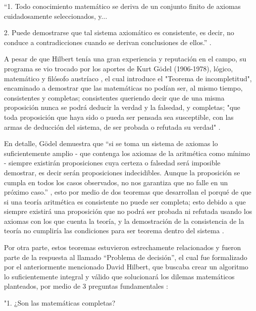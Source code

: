 \documentclass[12pt]{article}
\begin{document}
{“1. Todo conocimiento matemático se deriva de un conjunto finito de axiomas cuidadosamente seleccionados, y...

2. Puede demostrarse que tal sistema axiomático es consistente, es decir, no conduce a contradicciones cuando se derivan conclusiones de ellos.” \citep{IncytdeMorales}.
\newline

A pesar de que Hilbert tenía una gran experiencia y reputación en el campo, su programa se vio trocado por los aportes de Kurt Gödel (1906-1978), lógico, matemático y filósofo austríaco \citep{GodelWiki}, el cual introduce el "Teorema de incompletitud", encaminado a demostrar que las matemáticas no podían ser, al mismo tiempo, consistentes y completas; consistentes queriendo decir que de una misma proposición nunca se podrá deducir la verdad y la falsedad, y completas; "que toda proposición que haya sido o pueda ser pensada sea susceptible, con las armas de deducción del sistema, de ser probada o refutada su verdad" \citep{ScieloCrespo}. 
\newline

En detalle, Gödel demuestra que “si se toma un sistema de axiomas lo suficientemente amplio - que contenga los axiomas de la aritmética como mínimo - siempre existirán proposiciones cuya certeza o falsedad será imposible demostrar, es decir serán proposiciones indecidibles. Aunque la proposición se cumpla en todos los casos observados, no nos garantiza que no falle en un próximo caso.” \citep{ScieloCrespo}, esto por medio de dos teoremas que desarrollan el porqué de que si una teoría aritmética es consistente no puede ser completa; esto debido a que siempre existirá una proposición que no podrá ser probada ni refutada usando los axiomas con los que cuenta la teoría, y la demostración de la consistencia de la teoría no cumpliría las condiciones para ser teorema dentro del sistema \citep{IncomGodelWiki}.
\newline

Por otra parte, estos teoremas estuvieron estrechamente relacionados y fueron parte de la respuesta al llamado “Problema de decisión”, el cual fue formalizado por el anteriormente mencionado David Hilbert, que buscaba crear un algoritmo lo suficientemente integral y válido que solucionará los dilemas matemáticos planteados, por medio de 3 preguntas fundamentales \citep{TuringWiki}: 
\newline

"1.	¿Son las matemáticas completas?

}
\end{document}
